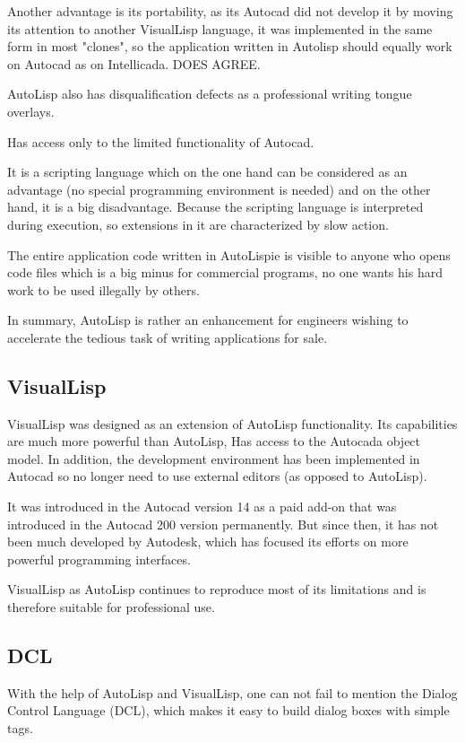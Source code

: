 \documentclass[a4paper, 11pt, article]{report}
\begin{document}
Another advantage is its portability, as its Autocad did not develop it by moving its attention to another VisualLisp language, it was implemented in the same form in most "clones", so the application written in Autolisp should equally work on Autocad as on Intellicada. DOES AGREE.

AutoLisp also has disqualification defects as a professional writing tongue overlays.

Has access only to the limited functionality of Autocad.

It is a scripting language which on the one hand can be considered as an advantage (no special programming environment is needed) and on the other hand, it is a big disadvantage. Because the scripting language is interpreted during execution, so extensions in it are characterized by slow action.

The entire application code written in AutoLispie is visible to anyone who opens code files which is a big minus for commercial programs, no one wants his hard work to be used illegally by others.

In summary, AutoLisp is rather an enhancement for engineers wishing to accelerate the tedious task of writing applications for sale.

\subsection{VisualLisp}

VisualLisp was designed as an extension of AutoLisp functionality. Its capabilities are much more powerful than AutoLisp, Has access to the Autocada object model. In addition, the development environment has been implemented in Autocad so no longer need to use external editors (as opposed to AutoLisp).

It was introduced in the Autocad version 14 as a paid add-on that was introduced in the Autocad 200 version permanently. But since then, it has not been much developed by Autodesk, which has focused its efforts on more powerful programming interfaces.

VisualLisp as AutoLisp continues to reproduce most of its limitations and is therefore suitable for professional use.

\subsection{DCL}
   
With the help of AutoLisp and VisualLisp, one can not fail to mention the Dialog Control Language (DCL), which makes it easy to build dialog boxes with simple tags.
\end{document}
